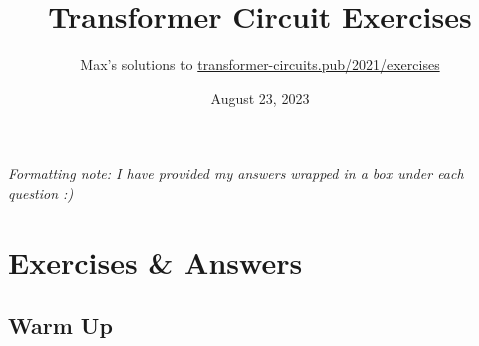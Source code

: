 \documentclass[11pt]{article}
\begin{document}
\title{\textbf{Transformer Circuit Exercises}}
\author{Max's solutions to \href{https://transformer-circuits.pub/2021/exercises}{transformer-circuits.pub/2021/exercises}}
\date{August 23, 2023}
\maketitle

\textit{Formatting note: I have provided my answers wrapped in a box under each question :)}

\section*{Exercises \& Answers}
\subsection*{Warm Up}
\end{document}
